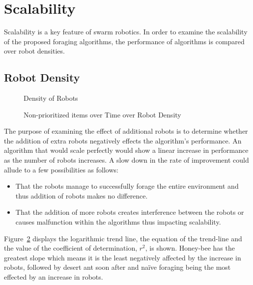\section{Scalability}
\label{results:scability}
Scalability is a key feature of swarm robotics. In order to examine the scalability of the proposed foraging algorithms, the performance of algorithms is compared over robot densities. 

\subsection{Robot Density}
\label{results:numberenvironments}


\begin{figure}[!htb]
\centering
\resizebox{\textwidth}{!}{}
\caption{Density of Robots }
\label{robotsgoldplot}
\end{figure}

\begin{figure}[!htb]
\centering
\resizebox{\textwidth}{!}{}
\caption{Non-prioritized items over Time over Robot Density}
\label{robotswasteplot}
\end{figure}

The purpose of examining the effect of additional robots is to determine whether the addition of extra robots negatively effects the algorithm's performance. An algorithm that would scale perfectly would show a linear increase in performance as the number of robots increases. A slow down in the rate of improvement could allude to a few possibilities as follows:

\begin{itemize}
\item That the robots manage to successfully forage the entire environment and thus addition of robots makes no difference.
\item That the addition of more robots creates interference between the robots or causes malfunction within the algorithms thus impacting scalability. 
\end{itemize}

Figure~\ref{robotswasteplot} displays the logarithmic trend line, the equation of the trend-line and the value of the coefficient of determination, $r^2$, is shown. Honey-bee has the greatest slope which means it is the least negatively affected by the increase in robots, followed by desert ant soon after and na\"ive foraging being the most effected by an increase in robots. 

